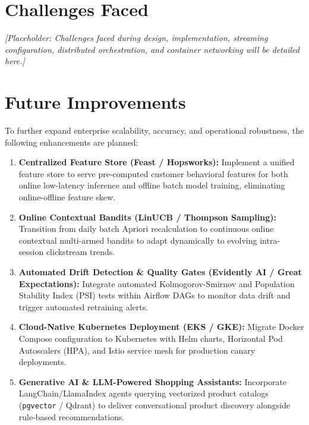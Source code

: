 \documentclass[11pt,a4paper]{article}
\begin{document}
\section{Challenges Faced}

\textit{[Placeholder: Challenges faced during design, implementation, streaming configuration, distributed orchestration, and container networking will be detailed here.]}

\section{Future Improvements}

To further expand enterprise scalability, accuracy, and operational robustness, the following enhancements are planned:

\begin{enumerate}
    \item \textbf{Centralized Feature Store (Feast / Hopsworks):} Implement a unified feature store to serve pre-computed customer behavioral features for both online low-latency inference and offline batch model training, eliminating online-offline feature skew.
    \item \textbf{Online Contextual Bandits (LinUCB / Thompson Sampling):} Transition from daily batch Apriori recalculation to continuous online contextual multi-armed bandits to adapt dynamically to evolving intra-session clickstream trends.
    \item \textbf{Automated Drift Detection \& Quality Gates (Evidently AI / Great Expectations):} Integrate automated Kolmogorov-Smirnov and Population Stability Index (PSI) tests within Airflow DAGs to monitor data drift and trigger automated retraining alerts.
    \item \textbf{Cloud-Native Kubernetes Deployment (EKS / GKE):} Migrate Docker Compose configuration to Kubernetes with Helm charts, Horizontal Pod Autoscalers (HPA), and Istio service mesh for production canary deployments.
    \item \textbf{Generative AI \& LLM-Powered Shopping Assistants:} Incorporate LangChain/LlamaIndex agents querying vectorized product catalogs (\texttt{pgvector} / Qdrant) to deliver conversational product discovery alongside rule-based recommendations.
\end{enumerate}
\end{document}
